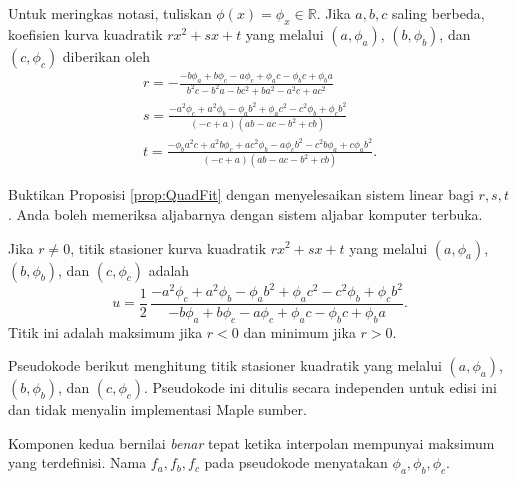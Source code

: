 \begin{proposition} Untuk meringkas notasi, tuliskan $\phi(x)=\phi_x\in\mathbb{R}$. Jika $a,b,c$ saling berbeda, koefisien kurva kuadratik $rx^2+sx+t$ yang melalui $(a,\phi_a)$, $(b,\phi_b)$, dan $(c,\phi_c)$ diberikan oleh
\begin{gather*}
r=-{\frac {-b\phi_{{a}}+b\phi_{{c}}-a\phi_{{c}}+\phi_{{a}}c-\phi_{{b}}
c+\phi_{{b}}a}{{b}^{2}c-{b}^{2}a-b{c}^{2}+b{a}^{2}-{a}^{2}c+a{c}^{2}}}
\\
s={\frac {-{a}^{2}\phi_{{c}}+{a}^{2}\phi_{{b}}-\phi_{{a}}{b}^{2}+\phi_
{{a}}{c}^{2}-{c}^{2}\phi_{{b}}+\phi_{{c}}{b}^{2}}{ \left( -c+a
 \right)  \left( ab-ac-{b}^{2}+cb \right) }}
\\
t={\frac {-\phi_{{b}}{a}^{2}c+{a}^{2}b\phi_{{c}}+a{c}^{2}\phi_{{b}}-a
\phi_{{c}}{b}^{2}-{c}^{2}b\phi_{{a}}+c\phi_{{a}}{b}^{2}}{ \left( -c+a
 \right)  \left( ab-ac-{b}^{2}+cb \right) }}.
\end{gather*}
\label{prop:QuadFit}
\end{proposition}

\begin{exercise} Buktikan Proposisi \ref{prop:QuadFit} dengan menyelesaikan sistem linear bagi $r,s,t$. Anda boleh memeriksa aljabarnya dengan sistem aljabar komputer terbuka.
\end{exercise}

\begin{corollary} Jika $r\neq0$, titik stasioner kurva kuadratik $rx^2+sx+t$ yang melalui $(a,\phi_a)$, $(b,\phi_b)$, dan $(c,\phi_c)$ adalah
\label{cor:QuadFitTurn}
\begin{equation}
u = \frac{1}{2}\,{\frac {-{a}^{2}\phi_{{c}}+{a}^{2}\phi_{{b}}-\phi_{{a}}{b}^{2}+
\phi_{{a}}{c}^{2}-{c}^{2}\phi_{{b}}+\phi_{{c}}{b}^{2}}{-b\phi_{{a}}+b
\phi_{{c}}-a\phi_{{c}}+\phi_{{a}}c-\phi_{{b}}c+\phi_{{b}}a}}.
\end{equation}
Titik ini adalah maksimum jika $r<0$ dan minimum jika $r>0$.
\end{corollary}

\begin{remark} Pseudokode berikut menghitung titik stasioner kuadratik yang melalui $(a,\phi_a)$, $(b,\phi_b)$, dan $(c,\phi_c)$. Pseudokode ini ditulis secara independen untuk edisi ini dan tidak menyalin implementasi Maple sumber.

\noindent{}

Komponen kedua bernilai \textit{benar} tepat ketika interpolan mempunyai maksimum yang terdefinisi. Nama $f_a,f_b,f_c$ pada pseudokode menyatakan $\phi_a,\phi_b,\phi_c$.
\end{remark}

